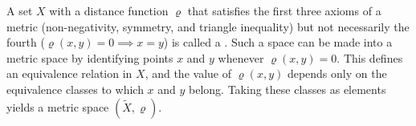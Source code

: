 A set $X$ with a distance function $\varrho$ that satisfies the first three axioms of a metric (non-negativity, symmetry, and triangle inequality) but not necessarily the fourth ($\varrho(x,y) = 0 \implies x = y$) is called a . Such a space can be made into a metric space by identifying points $x$ and $y$ whenever $\varrho(x,y) = 0$. This defines an equivalence relation in $X$, and the value of $\varrho(x,y)$ depends only on the equivalence classes to which $x$ and $y$ belong. Taking these classes as elements yields a metric space $(\tilde{X}, \varrho)$.
